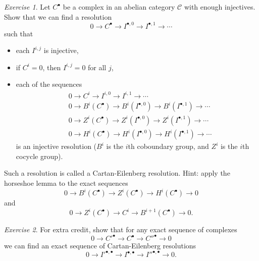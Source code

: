 \documentclass[letterpaper,11pt]{article}
\theoremstyle{definition}
\theoremstyle{remark}
\newtheorem{exer}{Exercise}
\begin{document}
\begin{exer} Let $C^\bullet$ be a complex in an abelian category $\mathcal{C}$ with enough injectives. Show that we can find a resolution
\[
0 \rightarrow C^\bullet \rightarrow I^{\bullet,0} \rightarrow I^{\bullet,1} \rightarrow \cdots
\]
such that
\begin{itemize}
\item each $I^{i,j}$ is injective,

\item if $C^i = 0$, then $I^{i,j} = 0$ for all $j$,

\item each of the sequences
\begin{align*}
&0 \rightarrow C^i \rightarrow I^{i,0} \rightarrow I^{i,1} \rightarrow \cdots\\
&0 \rightarrow B^i(C^\bullet) \rightarrow B^i(I^{\bullet,0}) \rightarrow B^i(I^{\bullet,1}) \rightarrow \cdots\\
&0 \rightarrow Z^i(C^\bullet) \rightarrow Z^i(I^{\bullet,0}) \rightarrow Z^i(I^{\bullet,1}) \rightarrow \cdots\\
&0 \rightarrow H^i(C^\bullet) \rightarrow H^i(I^{\bullet,0}) \rightarrow H^i(I^{\bullet,1}) \rightarrow \cdots
\end{align*}
is an injective resolution ($B^i$ is the $i$th coboundary group, and $Z^i$ is the $i$th cocycle group).
\end{itemize}
Such a resolution is called a Cartan-Eilenberg resolution. Hint: apply the horseshoe lemma to the exact sequences
\[
0 \rightarrow B^i(C^\bullet) \rightarrow Z^i(C^\bullet) \rightarrow H^i(C^\bullet) \rightarrow 0
\]
and
\[
0 \rightarrow Z^i(C^\bullet) \rightarrow C^i \rightarrow B^{i+1}(C^\bullet) \rightarrow 0.
\]
\end{exer}

\begin{exer} For extra credit, show that for any exact sequence of complexes
\[
0 \rightarrow C'^\bullet \rightarrow C^\bullet \rightarrow C''^\bullet \rightarrow 0
\]
we can find an exact sequence of Cartan-Eilenberg resolutions
\[
0 \rightarrow I'^{\bullet,\bullet} \rightarrow I^{\bullet,\bullet} \rightarrow I''^{\bullet,\bullet} \rightarrow 0.
\]
\end{exer}
\end{document}
